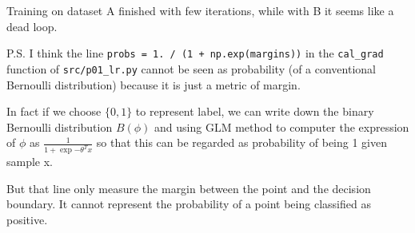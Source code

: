 \begin{answer}
    Training on dataset A finished with few iterations, while with B it seems like a dead loop.
    
    P.S. I think the line \texttt{probs = 1. / (1 + np.exp(margins))} in the \texttt{cal\_grad} function of \texttt{src/p01\_lr.py} cannot be seen as probability (of a conventional Bernoulli distribution) because it is just a metric of margin.
    
    In fact if we choose $ \{0,1\} $ to represent label, we can write down the binary Bernoulli distribution $ B(\phi) $ and using GLM method to computer the expression of $ \phi $ as $ \frac{1}{1+\exp{-\theta^Tx}} $ so that this can be regarded as probability of being 1 given sample x.
    
    But that line only measure the margin between the point and the decision boundary. It cannot represent the probability of a point being classified as positive. 
    
\end{answer}
